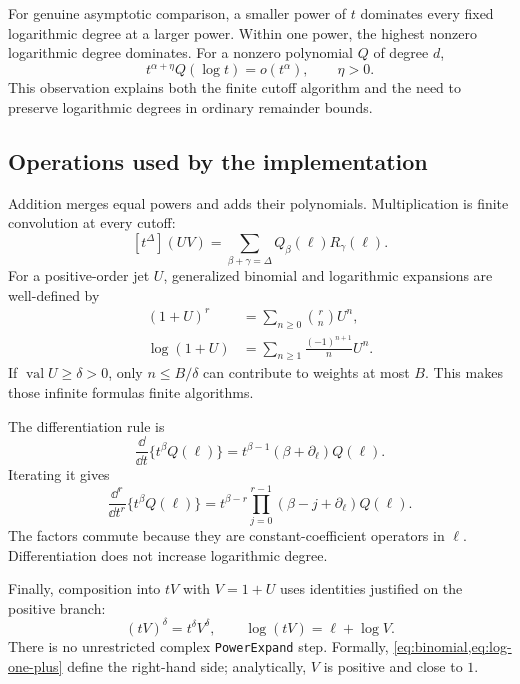 \documentclass[11pt,a4paper]{article}
\numberwithin{equation}{section}
\theoremstyle{definition}\newtheorem{definition}[theorem]{Definition}
\theoremstyle{remark}\newtheorem{remark}[theorem]{Remark}
\newcommand{\D}{\partial_\ell}
\newcommand{\val}{\operatorname{val}}
\newcommand{\code}[1]{\texttt{#1}}
\begin{document}
For genuine asymptotic comparison, a smaller power of $t$ dominates every
fixed logarithmic degree at a larger power. Within one power, the highest
nonzero logarithmic degree dominates. For a nonzero polynomial $Q$ of
degree $d$,
\[
 t^{\alpha+\eta}Q(\log t)=o(t^\alpha),\qquad \eta>0.
\]
This observation explains both the finite cutoff algorithm and the need
to preserve logarithmic degrees in ordinary remainder bounds.

\subsection{Operations used by the implementation}

Addition merges equal powers and adds their polynomials. Multiplication
is finite convolution at every cutoff:
\[
 [t^\Delta](UV)=\sum_{\beta+\gamma=\Delta}Q_\beta(\ell)R_\gamma(\ell).
\]
For a positive-order jet $U$, generalized binomial and logarithmic
expansions are well-defined by
\begin{align}
 (1+U)^r&=\sum_{n\ge0}\binom rn U^n,\label{eq:binomial}\\
 \log(1+U)&=\sum_{n\ge1}\frac{(-1)^{n+1}}nU^n.
 \label{eq:log-one-plus}
\end{align}
If $\val U\ge\delta>0$, only $n\le B/\delta$ can contribute to weights
at most $B$. This makes those infinite formulas finite algorithms.

The differentiation rule is
\begin{equation}
 \frac{\dd}{\dd t}\{t^\beta Q(\ell)\}
 =t^{\beta-1}(\beta+\D)Q(\ell).
 \label{eq:derivative-operator}
\end{equation}
Iterating it gives
\begin{equation}
 \frac{\dd^r}{\dd t^r}\{t^\beta Q(\ell)\}
 =t^{\beta-r}\prod_{j=0}^{r-1}(\beta-j+\D)Q(\ell).
 \label{eq:iterated-derivative}
\end{equation}
The factors commute because they are constant-coefficient operators in
$\ell$. Differentiation does not increase logarithmic degree.

Finally, composition into $tV$ with $V=1+U$ uses identities justified on
the positive branch:
\begin{equation}
 (tV)^\delta=t^\delta V^\delta,\qquad
 \log(tV)=\ell+\log V.
 \label{eq:normalized-composition}
\end{equation}
There is no unrestricted complex \code{PowerExpand} step. Formally,
\cref{eq:binomial,eq:log-one-plus} define the right-hand side; analytically,
$V$ is positive and close to $1$.
\end{document}
